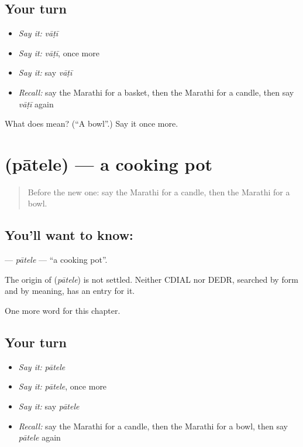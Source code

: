 \subsection*{Your turn}
\begin{itemize}
\raggedright
  \item \emph{Say it:} \emph{vāṭī}
  \item \emph{Say it:} \emph{vāṭī}, once more
  \item \emph{Say it:} say \emph{vāṭī}
  \item \emph{Recall:} say the Marathi for a basket, then the Marathi for a candle, then say \emph{vāṭī} again
\end{itemize}

\begin{tcolorbox}[breakable,colback=teal!4,colframe=teal!35!black,title={Before you move on}]
What does  mean? (\textquotedblleft{}A bowl\textquotedblright{}.) Say it once more.
\end{tcolorbox}
\section[\texorpdfstring{\mr{पातेले} (pātele)}{पातेले (pātele)}]{ (pātele) — a cooking pot}

\label{lesson:MR-C134-patele}



\begin{quote}
Before the new one: say the Marathi for a candle, then the Marathi for a bowl.
\end{quote}

\subsection*{You'll want to know: }
\textbf{} — \emph{pātele} — \textquotedblleft{}a cooking pot\textquotedblright{}.

\begin{cousinweb}
The origin of \textbf{} (\emph{pātele}) is not settled. Neither CDIAL nor DEDR, searched by form and by meaning, has an entry for it.
\end{cousinweb}

\begin{grammarlens}[title={What you've built}]
One more word for this chapter.
\end{grammarlens}

\subsection*{Your turn}
\begin{itemize}
\raggedright
  \item \emph{Say it:} \emph{pātele}
  \item \emph{Say it:} \emph{pātele}, once more
  \item \emph{Say it:} say \emph{pātele}
  \item \emph{Recall:} say the Marathi for a candle, then the Marathi for a bowl, then say \emph{pātele} again
\end{itemize}

